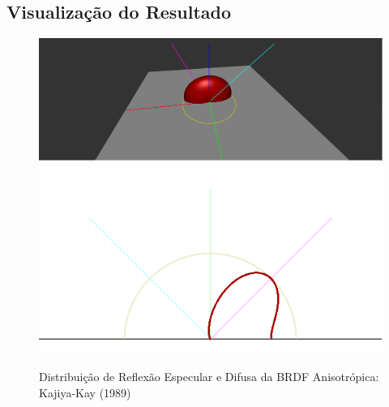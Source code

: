 \subsection{Visualização do Resultado}

\begin{figure}[H]
    \caption{\small{Distribuição de Reflexão Especular e Difusa da BRDF Anisotrópica: Kajiya-Kay (1989)}}\label{fig-kajiya-eqlang}
    \vspace{42px}
  \includegraphics[width=\linewidth]{./Imagens/brdfs/aniso-3D-plot}
\endminipage\hfill
{}
  \includegraphics[width=\linewidth]{./Imagens/brdfs/aniso-polar-plot.png}
\endminipage\hfill
\end{figure}

